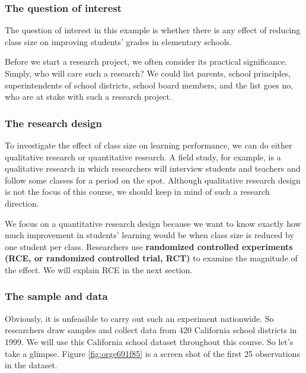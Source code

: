 \documentclass[a4paper,11pt]{article}
\begin{document}
\subsubsection*{The question of interest}
\label{sec:org5593453}

The question of interest in this example is whether there is
any effect of reducing class size on improving students' grades in
elementary schools.

Before we start a research project, we often consider its practical
significance. Simply, who will care such a research? We could list
parents, school principles, superintendents of school districts,
school board  members, and the list goes no, who are at stake with
such a research project.

\subsubsection*{The research design}
\label{sec:org91e2a7c}

To investigate the effect of class size on learning performance, we
can do either qualitative research or quantitative research. A field
study, for example, is a qualitative research in which researchers
will interview students and teachers and follow some classes for a
period on the spot. Although qualitative research design is not the focus of
this course, we should keep in mind of such a research direction.

We focus on a quantitative research design because we want to know
exactly how much improvement in students' learning would be when class
size is reduced by one student per class. Researchers use \textbf{randomized
controlled experiments (RCE, or randomized controlled trial, RCT)} to
examine the magnitude of the effect. We will explain RCE in the next
section.

\subsubsection*{The sample and data}
\label{sec:org0356f82}

Obviously, it is unfeasible to carry out such an experiment
nationwide. So researchers draw samples and collect data from 420
California school districts in 1999. We will use this California
school dataset throughout this course. So let's take a glimpse. Figure
\ref{fig:orge691f85} is a screen shot of the first 25 observations in the
dataset.
\end{document}
